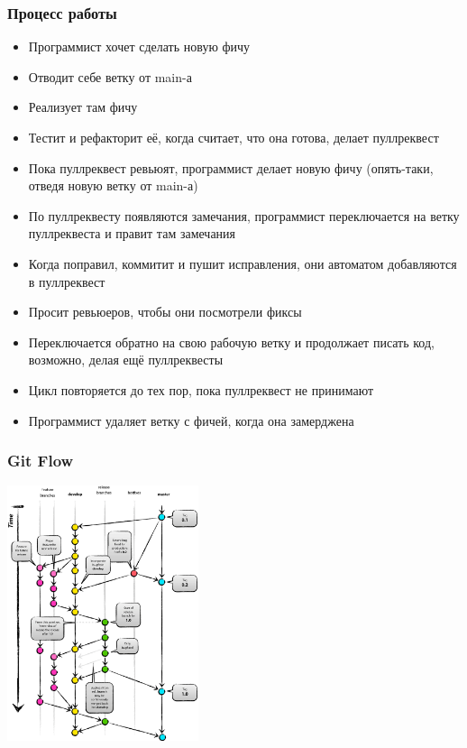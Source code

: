 \documentclass{../slides-style}
\begin{document}
    \begin{frame}
        \frametitle{Процесс работы}
        \begin{footnotesize}
            \begin{itemize}
                \item Программист хочет сделать новую фичу
                \item Отводит себе ветку от main-а
                \item Реализует там фичу
                \item Тестит и рефакторит её, когда считает, что она готова, делает пуллреквест
                \item Пока пуллреквест ревьюят, программист делает новую фичу (опять-таки, отведя новую ветку от main-а)
                \item По пуллреквесту появляются замечания, программист переключается на ветку пуллреквеста и правит там замечания
                \item Когда поправил, коммитит и пушит исправления, они автоматом добавляются в пуллреквест
                \item Просит ревьюеров, чтобы они посмотрели фиксы
                \item Переключается обратно на свою рабочую ветку и продолжает писать код, возможно, делая ещё пуллреквесты 
                \item Цикл повторяется до тех пор, пока пуллреквест не принимают
                \item Программист удаляет ветку с фичей, когда она замерджена
            \end{itemize}
        \end{footnotesize}
    \end{frame}

    \begin{frame}
        \frametitle{Git Flow}
        \begin{center}
            \includegraphics[width=0.42\textwidth]{gitFlow.png}
        \end{center}
    \end{frame}
\end{document}
